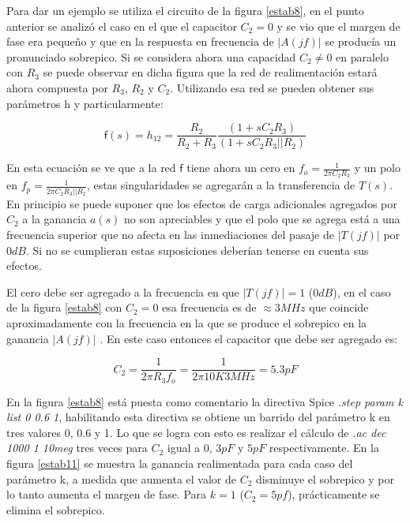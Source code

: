  	 
 	  Para dar un ejemplo se utiliza el circuito de la figura \ref{estab8}, en el punto anterior se analizó el caso en el que el capacitor $C_2=0$ y se vio que el margen de fase era pequeño y que en la respuesta en frecuencia de $|A(jf)|$ se producía un pronunciado sobrepico. Si se considera ahora una capacidad $C_2 \neq 0$ en paralelo con $R_3$ se puede observar en dicha figura que la red de realimentación estará ahora compuesta por $R_3$, $R_2$ y $C_2$. Utilizando esa red se pueden obtener sus parámetros $\textit{h}$ y particularmente:
 	 
 	 
 	 \medskip
 
 	 
 	 \begin{equation}\label{ecuestab3}
 	 	\textsf{f}(s)=h_{12}=\frac{\displaystyle R_2}{\displaystyle R_2+R_3}\frac{\displaystyle (1+sC_2R_3)}{\displaystyle (1+sC_2R_3||R_2)}
 	 \end{equation}
 	 
 	 
 	 \medskip

 
 	 
 	 En esta ecuación se ve que a la red $\textsf{f}$ tiene ahora un cero en $f_o=\frac{1}{2\pi C_2R_3}$ y un polo en $f_p=\frac{1}{2\pi C_2R_3||R_2}$, estas singularidades se agregarán a la transferencia de $T(s)$. En principio se puede suponer que los efectos de carga adicionales agregados por $C_2$ a la ganancia $a(s)$ no son apreciables y que el polo que se agrega está a una frecuencia superior que no afecta en las inmediaciones del pasaje de $|T(jf)|$ por $0dB$. Si no se cumplieran estas suposiciones deberían tenerse en cuenta sus efectos.
 	 
 	 El cero debe ser agregado a la frecuencia en que $|T(jf)|=1$ ($0dB$), en el caso de la figura \ref{estab8} con $C_2=0$ esa frecuencia es de $\approx 3MHz$ que coincide aproximadamente con la frecuencia en la que se produce el sobrepico en la ganancia $|A(jf)|$ \cite{gray95}. En este caso entonces el capacitor que debe ser agregado es:
 	 
 	 
 	 \medskip
 
 	 
 	 \begin{equation}\label{ecuestab4}
 	 C_2=\frac{\displaystyle 1}{\displaystyle 2\pi R_3f_o}=\frac{\displaystyle 1}{\displaystyle 2\pi 10K3MHz}=5.3pF
 	 \end{equation}


\medskip

 	 
 	 
 	 En la figura \ref{estab8} está puesta como comentario la directiva Spice \textit{.step param k list 0 0.6 1}, habilitando esta directiva se obtiene un barrido del parámetro k en tres valores 0, 0.6 y 1. Lo que se logra con esto es realizar el cálculo de \textit{.ac dec 1000 1 10meg} tres veces para $C_2$ igual a $0$, $3pF$ y $5pF$ respectivamente. En la figura \ref{estab11} se muestra la ganancia realimentada para cada caso del parámetro k, a medida que aumenta el valor de $C_2$ disminuye el sobrepico y por lo tanto aumenta el margen de fase. Para $k=1$ ($C_2=5pf$), prácticamente se elimina el sobrepico. 
 	 
 	 	    
 	   
 	   
 	   